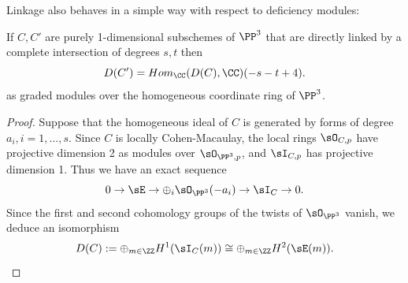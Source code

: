 Linkage also behaves in a simple way with respect to deficiency modules:

\begin{theorem}\label{HR}
If $C,C'$ are purely 1-dimensional subschemes of $\PP^3$ that are directly linked by a complete intersection of degrees $s,t$ then
$$
D(C') = Hom_\CC(D(C), \CC) (-s-t+4).
$$ 
as graded modules over the homogeneous coordinate ring of $\PP^3$.
\end{theorem}

\begin{proof}
Suppose that the homogeneous ideal of $C$ is generated by forms of degree $a_i, i=1,\dots,s$. Since $C$ is locally Cohen-Macaulay,
the local rings $\sO_{C,p}$ have projective dimension 2 as modules over $\sO_{\PP^3, p}$, and $\sI_{C,p}$ has projective dimension 1.
Thus we have an exact sequence
$$
0\to \sE \to \oplus_i\sO_{\PP^3}(-a_i) \to \sI_C \to 0.
$$
Since the first and second cohomology groups of the twists of $\sO_{\PP^3}$ vanish, we deduce an isomorphism
$$
D(C) := \oplus_{m\in \ZZ} H^1(\sI_C(m)) \cong \oplus_{m\in \ZZ} H^2(\sE(m)).
$$


\end{proof}
